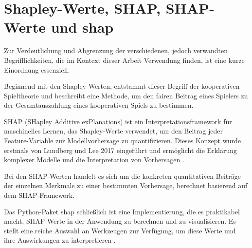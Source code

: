\section{Shapley-Werte, SHAP, SHAP-Werte und \textsf{shap}}

Zur Verdeutlichung und Abgrenzung der verschiedenen, jedoch verwandten Begrifflichkeiten, die im Kontext dieser Arbeit Verwendung finden, 
ist eine kurze Einordnung essenziell.

Beginnend mit den Shapley-Werten, entstammt dieser Begriff der kooperativen Spieltheorie und beschreibt eine Methode, 
um den fairen Beitrag eines Spielers zu der Gesamtauszahlung eines kooperativen Spiels zu bestimmen. 

SHAP (SHapley Additive exPlanations) ist ein Interpretationsframework für maschinelles Lernen, 
das Shapley-Werte verwendet, um den Beitrag jeder Feature-Variable zur Modellvorhersage 
zu quantifizieren. Dieses Konzept wurde erstmals von Lundberg und Lee 2017 eingeführt und 
ermöglicht die Erklärung komplexer Modelle und die Interpretation von Vorhersagen \cite[S. 1]{NIPS2017_8a20a862}.

Bei den SHAP-Werten handelt es sich um die konkreten quantitativen Beiträge der einzelnen Merkmale 
zu einer bestimmten Vorhersage, berechnet basierend auf dem SHAP-Framework.

Das Python-Paket \textsf{shap} schließlich ist eine Implementierung, die es praktikabel macht, SHAP-Werte in der Anwendung zu berechnen 
und zu visualisieren. Es stellt eine reiche Auswahl an Werkzeugen zur Verfügung, um diese Werte und ihre Auswirkungen zu interpretieren \cite[S. 14]{Molnar_2023}.